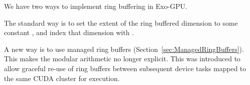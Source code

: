 
We have two ways to implement ring buffering in Exo-GPU.

The standard way is to set the extent of the ring buffered dimension to some constant , and index that dimension with .

A new way is to use managed ring buffers (Section~\ref{sec:ManagedRingBuffers}).
This makes the modular arithmetic no longer explicit.
This was introduced to allow graceful re-use of ring buffers between subsequent device tasks mapped to the same CUDA cluster for execution.
